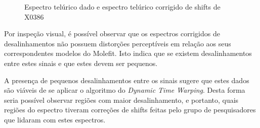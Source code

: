 \begin{figure}[htb]
  \centering
  \hfill
  \caption{Espectro telúrico dado e espectro telúrico corrigido de shifts de X0386}
  \label{fig:x0386-gt-telluric}
\end{figure}

Por inspeção visual, é possível observar que os espectros corrigidos de desalinhamentos não possuem distorções perceptíveis em relação aos seus correspondentes modelos do Molefit. Isto indica que se existem desalinhamentos entre estes sinais e que estes devem ser pequenos. 

A presença de pequenos desalinhamentos entre os sinais sugere que estes dados são viáveis de se aplicar o algoritmo do \textit{Dynamic Time Warping}. Desta forma seria possível observar regiões com maior desalinhamento, e portanto, quais regiões do espectro tiveram correções de shifts feitas pelo grupo de pesquisadores que lidaram com estes espectros.

